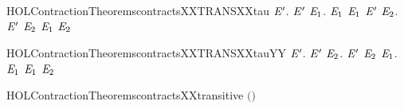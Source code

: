 \begin{SaveVerbatim}{HOLContractionTheoremscontractsXXTRANSXXtau}
\HOLTokenTurnstile{} \HOLSymConst{\HOLTokenForall{}} \ensuremath{\HOLBoundVar{E}\sp{\prime{}}}.
       \ensuremath{\HOLBoundVar{E}\sp{\prime{}}} \HOLSymConst{\HOLTokenImp{}}
     \HOLSymConst{\HOLTokenForall{}}\ensuremath{\HOLBoundVar{E}\sb{\mathrm{1}}}.
        \HOLTokenTransBegin\HOLConst{\ensuremath{\tau}}\HOLTokenTransEnd \ensuremath{\HOLBoundVar{E}\sb{\mathrm{1}}} \HOLSymConst{\HOLTokenImp{}}
       \ensuremath{\HOLBoundVar{E}\sb{\mathrm{1}}}  \ensuremath{\HOLBoundVar{E}\sp{\prime{}}} \HOLSymConst{\HOLTokenDisj{}} \HOLSymConst{\HOLTokenExists{}}\ensuremath{\HOLBoundVar{E}\sb{\mathrm{2}}}. \ensuremath{\HOLBoundVar{E}\sp{\prime{}}} \HOLTokenTransBegin\HOLConst{\ensuremath{\tau}}\HOLTokenTransEnd \ensuremath{\HOLBoundVar{E}\sb{\mathrm{2}}} \HOLSymConst{\HOLTokenConj{}} \ensuremath{\HOLBoundVar{E}\sb{\mathrm{1}}}  \ensuremath{\HOLBoundVar{E}\sb{\mathrm{2}}}
\end{SaveVerbatim}
\newcommand{\HOLContractionTheoremscontractsXXTRANSXXtau}{\UseVerbatim{HOLContractionTheoremscontractsXXTRANSXXtau}}
\begin{SaveVerbatim}{HOLContractionTheoremscontractsXXTRANSXXtauYY}
\HOLTokenTurnstile{} \HOLSymConst{\HOLTokenForall{}} \ensuremath{\HOLBoundVar{E}\sp{\prime{}}}.
       \ensuremath{\HOLBoundVar{E}\sp{\prime{}}} \HOLSymConst{\HOLTokenImp{}}
     \HOLSymConst{\HOLTokenForall{}}\ensuremath{\HOLBoundVar{E}\sb{\mathrm{2}}}. \ensuremath{\HOLBoundVar{E}\sp{\prime{}}} \HOLTokenTransBegin\HOLConst{\ensuremath{\tau}}\HOLTokenTransEnd \ensuremath{\HOLBoundVar{E}\sb{\mathrm{2}}} \HOLSymConst{\HOLTokenImp{}} \HOLSymConst{\HOLTokenExists{}}\ensuremath{\HOLBoundVar{E}\sb{\mathrm{1}}}.   \ensuremath{\HOLBoundVar{E}\sb{\mathrm{1}}} \HOLSymConst{\HOLTokenConj{}}  \ensuremath{\HOLBoundVar{E}\sb{\mathrm{1}}} \ensuremath{\HOLBoundVar{E}\sb{\mathrm{2}}}
\end{SaveVerbatim}
\newcommand{\HOLContractionTheoremscontractsXXTRANSXXtauYY}{\UseVerbatim{HOLContractionTheoremscontractsXXTRANSXXtauYY}}
\begin{SaveVerbatim}{HOLContractionTheoremscontractsXXtransitive}
\HOLTokenTurnstile{}  \ensuremath{(}\ensuremath{)}
\end{SaveVerbatim}
\newcommand{\HOLContractionTheoremscontractsXXtransitive}{\UseVerbatim{HOLContractionTheoremscontractsXXtransitive}}
